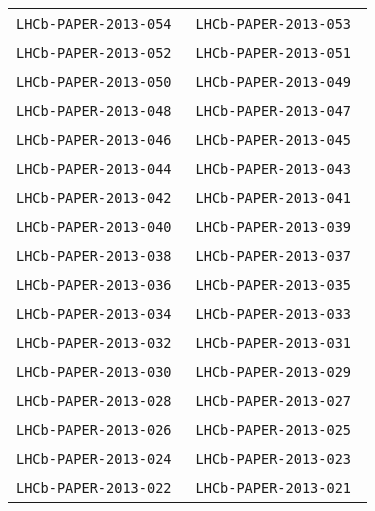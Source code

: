 \begin{center}
\begin{longtable}{ll}
\texttt{LHCb-PAPER-2013-054}~\cite{LHCb-PAPER-2013-054} &
\texttt{LHCb-PAPER-2013-053}~\cite{LHCb-PAPER-2013-053} \\
\texttt{LHCb-PAPER-2013-052}~\cite{LHCb-PAPER-2013-052} &
\texttt{LHCb-PAPER-2013-051}~\cite{LHCb-PAPER-2013-051} \\
\texttt{LHCb-PAPER-2013-050}~\cite{LHCb-PAPER-2013-050} &
\texttt{LHCb-PAPER-2013-049}~\cite{LHCb-PAPER-2013-049} \\
\texttt{LHCb-PAPER-2013-048}~\cite{LHCb-PAPER-2013-048} &
\texttt{LHCb-PAPER-2013-047}~\cite{LHCb-PAPER-2013-047} \\
\texttt{LHCb-PAPER-2013-046}~\cite{LHCb-PAPER-2013-046} &
\texttt{LHCb-PAPER-2013-045}~\cite{LHCb-PAPER-2013-045} \\
\texttt{LHCb-PAPER-2013-044}~\cite{LHCb-PAPER-2013-044} &
\texttt{LHCb-PAPER-2013-043}~\cite{LHCb-PAPER-2013-043} \\
\texttt{LHCb-PAPER-2013-042}~\cite{LHCb-PAPER-2013-042} &
\texttt{LHCb-PAPER-2013-041}~\cite{LHCb-PAPER-2013-041} \\
\texttt{LHCb-PAPER-2013-040}~\cite{LHCb-PAPER-2013-040} &
\texttt{LHCb-PAPER-2013-039}~\cite{LHCb-PAPER-2013-039} \\
\texttt{LHCb-PAPER-2013-038}~\cite{LHCb-PAPER-2013-038} &
\texttt{LHCb-PAPER-2013-037}~\cite{LHCb-PAPER-2013-037} \\
\texttt{LHCb-PAPER-2013-036}~\cite{LHCb-PAPER-2013-036} &
\texttt{LHCb-PAPER-2013-035}~\cite{LHCb-PAPER-2013-035} \\
\texttt{LHCb-PAPER-2013-034}~\cite{LHCb-PAPER-2013-034} &
\texttt{LHCb-PAPER-2013-033}~\cite{LHCb-PAPER-2013-033} \\
\texttt{LHCb-PAPER-2013-032}~\cite{LHCb-PAPER-2013-032} &
\texttt{LHCb-PAPER-2013-031}~\cite{LHCb-PAPER-2013-031} \\
\texttt{LHCb-PAPER-2013-030}~\cite{LHCb-PAPER-2013-030} &
\texttt{LHCb-PAPER-2013-029}~\cite{LHCb-PAPER-2013-029} \\
\texttt{LHCb-PAPER-2013-028}~\cite{LHCb-PAPER-2013-028} &
\texttt{LHCb-PAPER-2013-027}~\cite{LHCb-PAPER-2013-027} \\
\texttt{LHCb-PAPER-2013-026}~\cite{LHCb-PAPER-2013-026} &
\texttt{LHCb-PAPER-2013-025}~\cite{LHCb-PAPER-2013-025} \\
\texttt{LHCb-PAPER-2013-024}~\cite{LHCb-PAPER-2013-024} &
\texttt{LHCb-PAPER-2013-023}~\cite{LHCb-PAPER-2013-023} \\
\texttt{LHCb-PAPER-2013-022}~\cite{LHCb-PAPER-2013-022} &
\texttt{LHCb-PAPER-2013-021}~\cite{LHCb-PAPER-2013-021} \\

\end{longtable}
\end{center}
